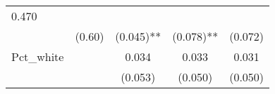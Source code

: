 \documentclass[12pt,twoside]{reedthesis}
\begin{document}
\begin{longtable}[]{@{}lcccc@{}}
\begin{minipage}[t]{0.11\columnwidth}
  0.470\strut
  \end{minipage}\tabularnewline
  \begin{minipage}[t]{0.26\columnwidth}\raggedright\strut
  \strut
  \end{minipage} & \begin{minipage}[t]{0.12\columnwidth}\centering\strut
  (0.60)\strut
  \end{minipage} & \begin{minipage}[t]{0.14\columnwidth}\centering\strut
  (0.045)**\strut
  \end{minipage} & \begin{minipage}[t]{0.14\columnwidth}\centering\strut
  (0.078)**\strut
  \end{minipage} & \begin{minipage}[t]{0.11\columnwidth}\centering\strut
  (0.072)\strut
  \end{minipage}\tabularnewline
  \begin{minipage}[t]{0.26\columnwidth}\raggedright\strut
  Pct\_white\strut
  \end{minipage} & \begin{minipage}[t]{0.12\columnwidth}\centering\strut
  \strut
  \end{minipage} & \begin{minipage}[t]{0.14\columnwidth}\centering\strut
  0.034\strut
  \end{minipage} & \begin{minipage}[t]{0.14\columnwidth}\centering\strut
  0.033\strut
  \end{minipage} & \begin{minipage}[t]{0.11\columnwidth}\centering\strut
  0.031\strut
  \end{minipage}\tabularnewline
  \begin{minipage}[t]{0.26\columnwidth}\raggedright\strut
  \strut
  \end{minipage} & \begin{minipage}[t]{0.12\columnwidth}\centering\strut
  \strut
  \end{minipage} & \begin{minipage}[t]{0.14\columnwidth}\centering\strut
  (0.053)\strut
  \end{minipage} & \begin{minipage}[t]{0.14\columnwidth}\centering\strut
  (0.050)\strut
  \end{minipage} & \begin{minipage}[t]{0.11\columnwidth}\centering\strut
  (0.050)\strut
  \end{minipage}\tabularnewline

\end{longtable}
\end{document}
